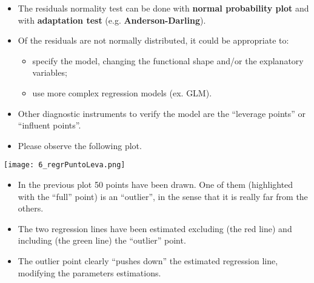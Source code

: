 \begin{frame}
  \vspace{.5cm}
  \begin{itemize}
    \item The residuals normality test can be done with \textbf{normal probability plot} and with \textbf{adaptation test} (e.g. \textbf{Anderson-Darling}).
    \vspace{.5cm}
    \item Of the residuals are not normally distributed, it could be appropriate to:
    \begin{itemize}
      \item specify the model, changing the functional shape and/or the explanatory variables;
      \item use more complex regression models (ex. GLM).
    \end{itemize}
  \end{itemize}
\end{frame}


\begin{frame}
 \begin{itemize}
    \item Other diagnostic instruments to verify the model are the ``leverage points'' or ``influent points''.
    \item Please observe the following plot.
  \end{itemize}
  \begin{center}
    \texttt{[image: 6\_regrPuntoLeva.png]}
  \end{center}
\end{frame}

\begin{frame}
\vspace{0.5cm}
  \begin{itemize}
    \item In the previous plot 50 points have been drawn. One of them (highlighted with the ``full'' point) is an ``outlier'', in the sense that it is really far from the others.
    \vspace{0.5cm}
    \item The two regression lines have been estimated excluding (the red line) and including (the green line) the ``outlier'' point.
    \vspace{0.5cm}
    \item The outlier point clearly ``pushes down'' the estimated regression line, modifying the parameters estimations.
  \end{itemize}
\end{frame}


